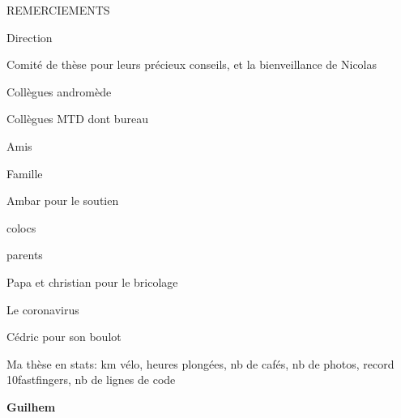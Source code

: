 
{}
{\centerline { {\sffamily \Large REMERCIEMENTS}}}

\vspace*{1cm}
\vskip 0.5cm
\noindent

Direction

Comité de thèse pour leurs précieux conseils, et la bienveillance de Nicolas

Collègues andromède

Collègues MTD dont bureau

Amis

Famille

Ambar pour le soutien

colocs

parents

Papa et christian pour le bricolage

Le coronavirus

Cédric pour son boulot

Ma thèse en stats: km vélo, heures plongées, nb de cafés, nb de photos, record 10fastfingers, nb de lignes de code


\vskip 0.3cm
\noindent
 \qquad  \qquad \qquad \qquad \qquad \qquad \qquad \qquad \quad \textbf{Guilhem}

